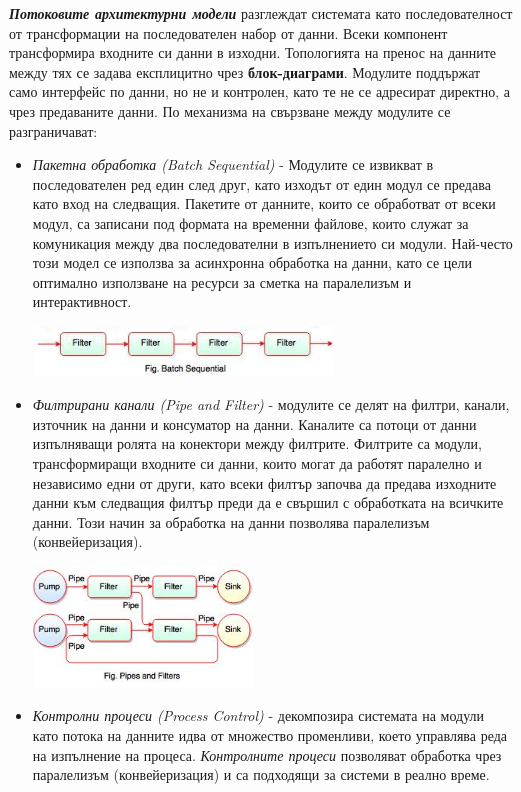 \documentclass[fleqn,12pt]{article}
\begin{document}
\textbf{\textit{Потоковите архитектурни модели}} разглеждат системата като последователност от трансформации на последователен набор от данни.
Всеки компонент трансформира входните си данни в изходни.
Топологията на пренос на данните между тях се задава експлицитно чрез \textbf{блок-диаграми}.
Модулите поддържат само интерфейс по данни, но не и контролен, като те не се адресират директно, а чрез предаваните данни.
\bigbreak
По механизма на свързване между модулите се разграничават:
\begin{itemize}
    \item \textit{Пакетна обработка (Batch Sequential)} - Модулите се извикват в последователен ред един след друг, като изходът от един модул се предава като вход на следващия.
    Пакетите от данните, които се обработват от всеки модул, са записани под формата на временни файлове, които служат за комуникация между два последователни в изпълнението си модули. 
    Най-често този модел се използва за асинхронна обработка на данни, като се цели оптимално използване на ресурси за сметка на паралелизъм и интерактивност.
    \begin{center} \includegraphics[width=300px]{batch_sequential.jpg} \end{center}
    \item \textit{Филтрирани канали (Pipe and Filter)} - модулите се делят на филтри, канали, източник на данни и консуматор на данни.
    Каналите са потоци от данни изпълняващи ролята на конектори между филтрите. 
    Филтрите са модули, трансформиращи входните си данни, които могат да работят паралелно и независимо едни от други, като всеки филтър започва да предава изходните данни към следващия филтър преди да е свършил с обработката на всичките данни.
    Този начин за обработка на данни позволява паралелизъм (конвейеризация).
    \begin{center} \includegraphics[width=220px]{pipe_and_filter.jpg} \end{center}
    \item \textit{Контролни процеси (Process Control)} - декомпозира системата на модули като потока на данните идва от множество променливи, което управлява реда на изпълнение на процеса.
    \textit{Контролните процеси} позволяват обработка чрез паралелизъм (конвейеризация) и са подходящи за системи в реално време.
\end{itemize}
\end{document}
